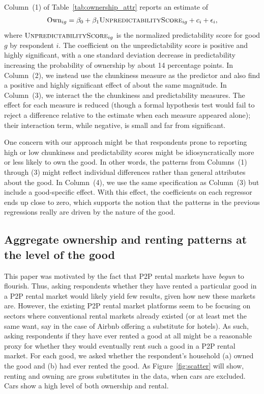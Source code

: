 \documentclass[11pt]{article}
\begin{document}
Column~(1) of Table~\ref{tab:ownership_attr} reports an estimate of 
\begin{align}
  \text{Own}_{ig} = \beta_0 + \beta_1 \textsc{UnpredictabilityScore}_{ig} + c_i + \epsilon_i,
\end{align} 
where $\textsc{UnpredictabilityScore}_{ig}$ is the normalized predictability score for good $g$ by respondent $i$.
The coefficient on the unpredictability score is positive and highly significant, with a one standard deviation decrease in predictability increasing the probability of ownership by about 14 percentage points. 
In Column~(2), we instead use the chunkiness measure as the predictor and also find a positive and highly significant effect of about the same magnitude. 
In Column~(3), we interact the the chunkiness and predictability measures.
The effect for each measure is reduced (though a formal hypothesis test would fail to reject a difference relative to the estimate when each measure appeared alone); their interaction term, while negative, is small and far from significant.

One concern with our approach might be that respondents prone to reporting high or low chunkiness and predictability scores might be idiosyncratically more or less likely to own the good.
In other words, the patterns from Columns~(1) through (3) might reflect individual differences rather than general attributes about the good.
In Column~(4), we use the same specification as Column~(3) but include a good-specific effect.
With this effect, the coefficients on each regressor ends up close to zero, which supports the notion that the patterns in the previous regressions really are driven by the nature of the good. 

\subsection{Aggregate ownership and renting patterns at the level of the good}

This paper was motivated by the fact that P2P rental markets have \emph{begun} to flourish.
Thus, asking respondents whether they have rented a particular good in a P2P rental market would likely yield few results, given how new these markets are.
However, the existing P2P rental market platforms seem to be focusing on sectors where conventional rental markets already existed (or at least met the same want, say in the case of Airbnb offering a substitute for hotels).
As such, asking respondents if they have ever rented a good at all might be a reasonable proxy for whether they would eventually rent such a good in a P2P rental market. 
For each good, we asked whether the respondent's household (a) owned the good and (b) had ever rented the good.
As Figure~\ref{fig:scatter} will show, renting and owning are gross substitutes in the data, when cars are excluded.
Cars show a high level of both ownership and rental. 
\end{document}
